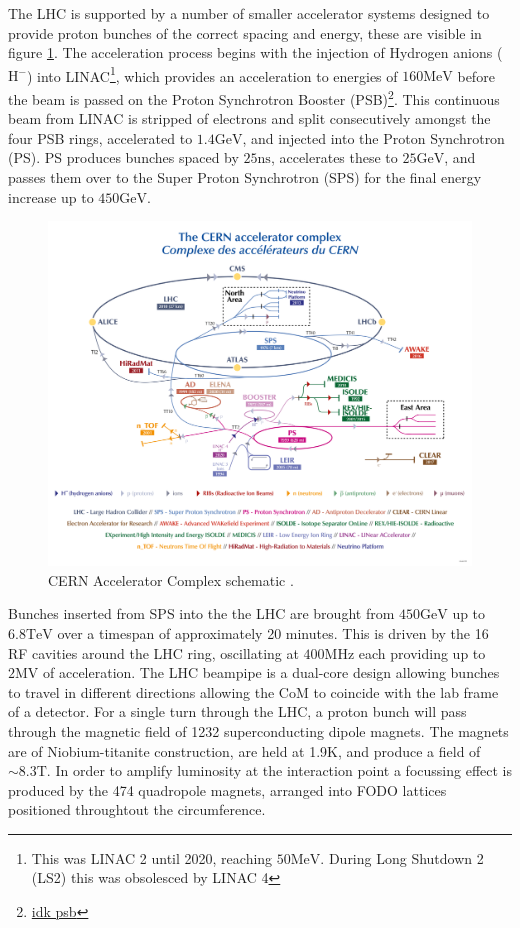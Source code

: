 The LHC is supported by a number of smaller accelerator systems designed to provide proton bunches of the correct spacing and energy, these are visible in figure \ref{fig:accel_complex}. The acceleration process begins with the injection of Hydrogen anions ($\text{H}^{-}$) into LINAC\footnote{This was LINAC 2 until 2020, reaching $50\text{MeV}$. During Long Shutdown 2 (LS2) this was obsolesced by LINAC 4}, which provides an acceleration to energies of $160\text{MeV}$ before the beam is passed on the Proton Synchrotron Booster (PSB)\footnote{\href{https://cds.cern.ch/journal/CERNBulletin/2016/32/News\%20Articles/2201549?ln=en}{idk psb}}. This continuous beam from LINAC is stripped of electrons and split consecutively amongst the four PSB rings, accelerated to $1.4\text{GeV}$, and injected into the Proton Synchrotron (PS). PS produces bunches spaced by $25\text{ns}$, accelerates these to $25\text{GeV}$, and passes them over to the Super Proton Synchrotron (SPS) for the final energy increase up to $450\text{GeV}$.
\begin{figure}[!h]
    \centering
    \includegraphics[]{figures/lhc_and_atlas/CCC-v2022.png}
    \caption{CERN Accelerator Complex schematic \cite{Lopienska:2800984}. }
    \label{fig:accel_complex}
\end{figure}
Bunches inserted from SPS into the the LHC are brought from $450\text{GeV}$ up to $6.8\text{TeV}$ over a timespan of approximately 20 minutes. This is driven by the 16 RF cavities around the LHC ring, oscillating at $400\text{MHz}$ each providing up to $2\text{MV}$ of acceleration. The LHC beampipe is a dual-core design allowing bunches to travel in different directions allowing the CoM to coincide with the lab frame of a detector. For a single turn through the LHC, a proton bunch will pass through the magnetic field of 1232 superconducting dipole magnets. The magnets are of Niobium-titanite construction, are held at 1.9K, and produce a field of $\sim8.3\text{T}$. In order to amplify luminosity at the interaction point a focussing effect is produced by the 474 quadropole magnets, arranged into FODO lattices positioned throughtout the circumference.

